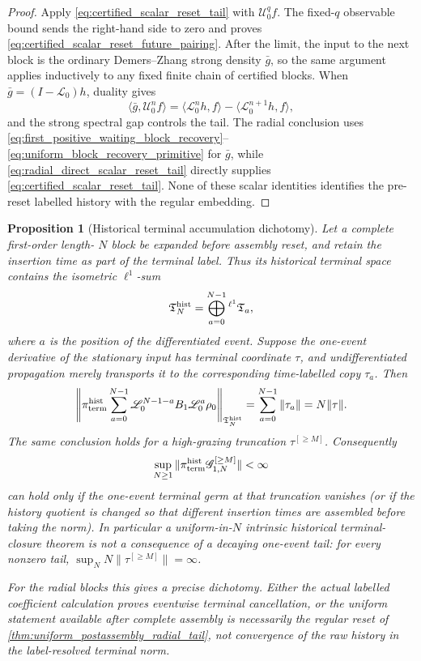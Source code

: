 \documentclass[11pt]{amsart}
\theoremstyle{compactplain}
\newtheorem{proposition}[theorem]{Proposition}
\theoremstyle{compactdefinition}
\theoremstyle{compactremark}
\newcommand{\Ltransfer}{\mathscr L}
\begin{document}
\begin{proof}
Apply \eqref{eq:certified_scalar_reset_tail} with
\(\mathscr U_0^qf\).  The fixed-\(q\) observable bound sends the right-hand
side to zero and proves
\eqref{eq:certified_scalar_reset_future_pairing}.  After the limit, the input
to the next block is the ordinary Demers--Zhang strong density \(\bar g\), so the same
argument applies inductively to any fixed finite chain of certified blocks.
When \(\bar g=(I-\Ltransfer_0)h\), duality gives
\[
 \langle\bar g,\mathscr U_0^nf\rangle
 =
 \langle\Ltransfer_0^nh,f\rangle
 -\langle\Ltransfer_0^{n+1}h,f\rangle,
\]
and the strong spectral gap controls the tail.  The radial conclusion uses
\eqref{eq:first_positive_waiting_block_recovery}--
\eqref{eq:uniform_block_recovery_primitive} for \(\bar g\), while
\eqref{eq:radial_direct_scalar_reset_tail} directly supplies
\eqref{eq:certified_scalar_reset_tail}.  None of these scalar identities
identifies the pre-reset labelled history with the regular embedding.
\end{proof}

\begin{proposition}[Historical terminal accumulation dichotomy]
\label{prop:historical_terminal_accumulation_dichotomy}
Let a complete first-order length-
\(N\) block be expanded before assembly reset, and retain the insertion time
as part of the terminal label.  Thus its historical terminal space contains
the isometric \(\ell^1\)-sum
\[
 \mathfrak T_{N}^{\rm hist}
 =\bigoplus_{a=0}^{N-1}{}^{\ell^1}\mathfrak T_a,
\]
where \(a\) is the position of the differentiated event.  Suppose the
one-event derivative of the stationary input has terminal coordinate
\(\tau\), and undifferentiated propagation merely transports it to the
corresponding time-labelled copy \(\tau_a\).  Then
\begin{equation}
\label{eq:historical_terminal_linear_growth}
 \left\|\pi_{\rm term}^{\rm hist}
   \sum_{a=0}^{N-1}
   \Ltransfer_0^{N-1-a}B_1\Ltransfer_0^a\rho_0
 \right\|_{\mathfrak T_N^{\rm hist}}
 =\sum_{a=0}^{N-1}\|\tau_a\|
 =N\|\tau\|.
\end{equation}
The same conclusion holds for a high-grazing truncation
\(\tau^{[\ge M]}\).  Consequently
\[
 \sup_{N\ge1}
 \|\pi_{\rm term}^{\rm hist}\mathscr G_{1,N}^{[\ge M]}\|<\infty
\]
can hold only if the one-event terminal germ at that truncation vanishes (or
if the history quotient is changed so that different insertion times are
assembled before taking the norm).  In particular a uniform-in-\(N\)
intrinsic historical terminal-closure theorem is not a consequence of a
decaying one-event tail: for every nonzero tail,
\(\sup_N N\|\tau^{[\ge M]}\|=\infty\).

For the radial blocks this gives a precise dichotomy.  Either the actual
labelled coefficient calculation proves eventwise terminal cancellation, or
the uniform statement available after complete assembly is necessarily the
regular reset of
\cref{thm:uniform_postassembly_radial_tail}, not convergence of the raw
history in the label-resolved terminal norm.
\end{proposition}
\end{document}
